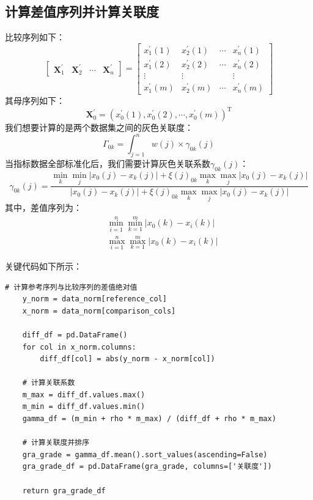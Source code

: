 \subsection{计算差值序列并计算关联度}
比较序列如下：
$$
    \left[\begin{array}{llll}
            \boldsymbol{X}_1^{\prime} & \boldsymbol{X}_2^{\prime} & \cdots & \boldsymbol{X}_n^{\prime}
        \end{array}\right]=\left[\begin{array}{cccc}
            x_1^{\prime}(1) & x_2^{\prime}(1) & \cdots & x_n^{\prime}(1) \\
            x_1^{\prime}(2) & x_2^{\prime}(2) & \cdots & x_n^{\prime}(2) \\
            \vdots          & \vdots          &        & \vdots          \\
            x_1^{\prime}(m) & x_2^{\prime}(m) & \cdots & x_n^{\prime}(m)
        \end{array}\right]
$$
其母序列如下：
$$
    \boldsymbol{X}_0^{\prime}=\left(x_0^{\prime}(1), x_0^{\prime}(2), \cdots, x_0^{\prime}(m)\right)^{\mathrm{T}}
$$
我们想要计算的是两个数据集之间的灰色关联度：
$$
    \Gamma_{0 k}=\int_{j=1}^n w(j) \times \gamma_{0 k}(j)
$$
当指标数据全部标准化后，我们需要计算灰色关联系数$\gamma_{0 k}(j)$：
$$
    \gamma_{0 k}(j)=\frac{\min _k \min _j\left|x_0(j)-x_k(j)\right|+\xi(j)_{0 k} \max _k \max _j\left|x_0(j)-x_k(j)\right|}{\left|x_0(j)-x_k(j)\right|+\xi(j)_{0 k} \max _k \max _j\left|x_0(j)-x_k(j)\right|}
$$
其中，差值序列为：
$$
    \begin{aligned}
         & \min _{i=1}^n \min _{k=1}^m\left|x_0(k)-x_i(k)\right| \\
         & \max _{i=1}^n \max _{k=1}^m\left|x_0(k)-x_i(k)\right|
    \end{aligned}
$$

关键代码如下所示：

\begin{lstlisting}[style=python]
    # 计算参考序列与比较序列的差值绝对值
    y_norm = data_norm[reference_col]
    x_norm = data_norm[comparison_cols]

    diff_df = pd.DataFrame()
    for col in x_norm.columns:
        diff_df[col] = abs(y_norm - x_norm[col])

    # 计算关联系数
    m_max = diff_df.values.max()
    m_min = diff_df.values.min()
    gamma_df = (m_min + rho * m_max) / (diff_df + rho * m_max)

    # 计算关联度并排序
    gra_grade = gamma_df.mean().sort_values(ascending=False)
    gra_grade_df = pd.DataFrame(gra_grade, columns=['关联度'])

    return gra_grade_df
\end{lstlisting}

